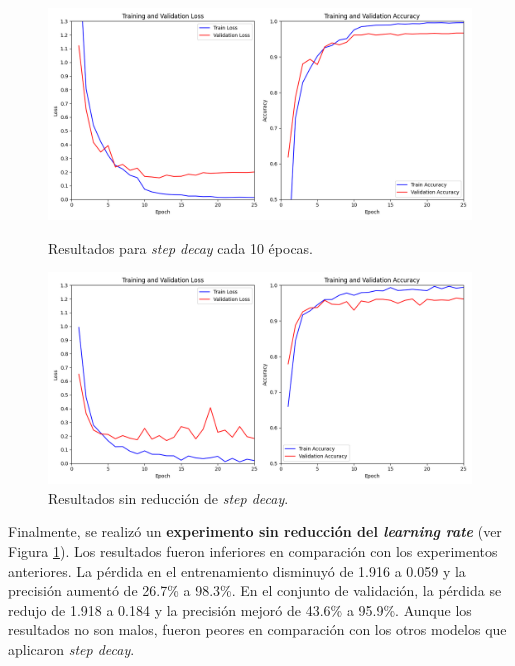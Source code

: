 \begin{figure}[h]
    \centering
    \begin{minipage}{0.45\textwidth}
        \centering
        \includegraphics[width=\textwidth]{img/malware_classifier_lr10.png}
        \caption{Resultados para \textit{step decay} cada 10 épocas.}
        \label{fig:step_decay_10_epochs}
    \end{minipage}\hfill
    \begin{minipage}{0.45\textwidth}
        \centering
        \includegraphics[width=\textwidth]{img/malware_classifier_lr30_droupout0.png}
        \caption{Resultados sin reducción de \textit{step decay}.}
        \label{fig:step_decay_never}
    \end{minipage}
\end{figure}

Finalmente, se realizó un \textbf{experimento sin reducción del \textit{learning rate}} (ver Figura \ref{fig:step_decay_never}). Los resultados fueron inferiores en comparación con los experimentos anteriores. La pérdida en el entrenamiento disminuyó de 1.916 a 0.059 y la precisión aumentó de 26.7\% a 98.3\%. En el conjunto de validación, la pérdida se redujo de 1.918 a 0.184 y la precisión mejoró de 43.6\% a 95.9\%.  Aunque los resultados no son malos, fueron peores en comparación con los otros modelos que aplicaron \textit{step decay}.


